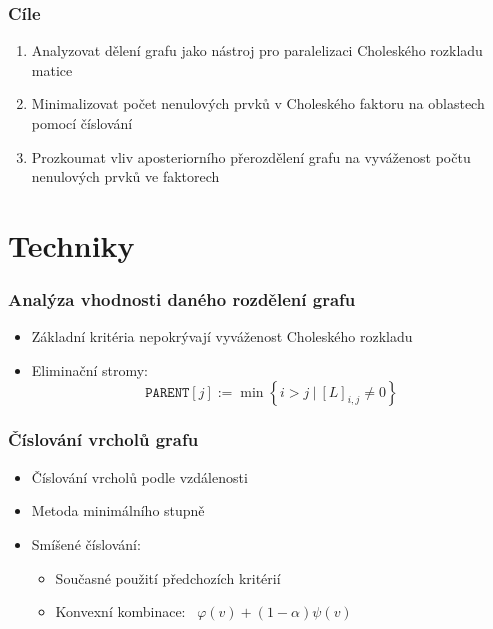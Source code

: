 \documentclass{beamer}
\begin{document}
\begin{frame}
	\frametitle{Cíle}
  \begin{enumerate}
    \item Analyzovat dělení grafu jako nástroj pro paralelizaci Choleského rozkladu matice
    \medskip
    \item Minimalizovat počet nenulových prvků v Choleského faktoru na oblastech pomocí číslování
    \medskip
    \item Prozkoumat vliv aposteriorního přerozdělení grafu na vyváženost počtu nenulových prvků ve faktorech
  \end{enumerate}
\end{frame}

	\section{Techniky}
\begin{frame}
  \frametitle{Analýza vhodnosti daného rozdělení grafu}
  \begin{itemize}
    \item Základní kritéria nepokrývají vyváženost Choleského rozkladu
    \medskip
    \item Eliminační stromy:
    \[\texttt{PARENT}[j] := \min \left\{ i > j \ | \ [L]_{i,j} \neq 0\right\}
    \]
  \end{itemize}
\end{frame}


\begin{frame}
  \frametitle{Číslování vrcholů grafu}
  \begin{itemize}
    \item Číslování vrcholů podle vzdálenosti
    \medskip
    \item Metoda minimálního stupně
    \medskip
    \item Smíšené číslování:
    \medskip
    \begin{itemize}
      \item Současné použití předchozích kritérií
      \medskip
      \item Konvexní kombinace: \ $\varphi(v) + (1-\alpha)\psi(v)$
    \end{itemize}
  \end{itemize}
\end{frame}
\end{document}
